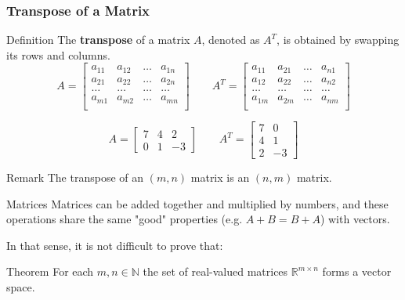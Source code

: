 \documentclass{beamer}
\newcommand{\N}{\mathbb{N}}
\newcommand{\R}{\mathbb{R}}
\begin{document}
\begin{frame}
  \frametitle{Transpose of a Matrix}

  \begin{block}{Definition}
    The \textbf{transpose} of a matrix \(A\), denoted as \(A^T\), is obtained by swapping its rows and columns.
    \[A = \begin{bmatrix}
        a_{11} & a_{12} & \ldots & a_{1n} \\
        a_{21} & a_{22} & \ldots & a_{2n} \\
         \ldots & \ldots & \ldots & \ldots  \\
        a_{m1} & a_{m2} & \ldots & a_{mn} \\
      \end{bmatrix}\qquad A^T = \begin{bmatrix}
        a_{11} & a_{21} & \ldots & a_{n1} \\
        a_{12} & a_{22} & \ldots & a_{n2} \\
         \ldots & \ldots & \ldots & \ldots  \\
        a_{1m} & a_{2m} & \ldots & a_{nm} \\
      \end{bmatrix}\]
  \end{block}

  \pause

  \begin{example}
    \[
      A = \begin{bmatrix}
        7&4&2\\0&1&-3
      \end{bmatrix}\qquad
      A^T = \begin{bmatrix}
        7 & 0 \\
        4 & 1 \\
        2 & -3
      \end{bmatrix}
    \]
  \end{example}

  \pause

  \begin{block}{Remark}
    The transpose of an $(m,n)$ matrix is an $(n,m)$ matrix.
  \end{block}

\end{frame}


\begin{frame}{Matrices}
    Matrices can be added together and multiplied by numbers, and these operations share the same "good" properties (e.g. $A+B=B+A$) with vectors. \pause

    \bigskip 
    In that sense, it is not difficult to prove that:
\bigskip
    \begin{block}{Theorem}
    For each $m,n\in\N$ the set of real-valued matrices $\R^{m\times n}$ forms a vector space.

    \end{block}
\end{frame}
\end{document}
